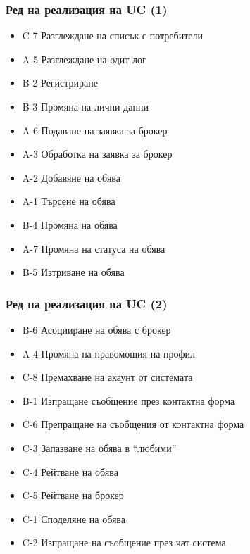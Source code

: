 \documentclass[12pt]{beamer}
\begin{document}
\begin{frame}[fragile]
\frametitle{Ред на реализация на UC (1)}
\begin{itemize}
\item C-7	Разглеждане на списък с потребители
\item A-5	Разглеждане на одит лог
\item B-2	Регистриране
\item B-3	Промяна на лични данни
\item A-6	Подаване на заявка за брокер
\item A-3	Обработка на заявка за брокер
\item A-2	Добавяне на обява
\item A-1	Търсене на обява
\item B-4	Промяна на обява
\item A-7	Промяна на статуса на обява
\item B-5	Изтриване на обява
\end{itemize}
\end{frame}

\begin{frame}[fragile]
\frametitle{Ред на реализация на UC (2)}
\begin{itemize}
\item B-6	Асоцииране на обява с брокер
\item A-4	Промяна на правомощия на профил
\item C-8	Премахване на акаунт от системата
\item B-1	Изпращане съобщение през контактна форма
\item C-6	Препращане на съобщения от контактна форма
\item C-3	Запазване на обява в ``любими''
\item C-4	Рейтване на обява
\item C-5	Рейтване на брокер
\item C-1	Споделяне на обява
\item C-2	Изпращане на съобщение през чат система
\end{itemize}
\end{frame}
\end{document}
